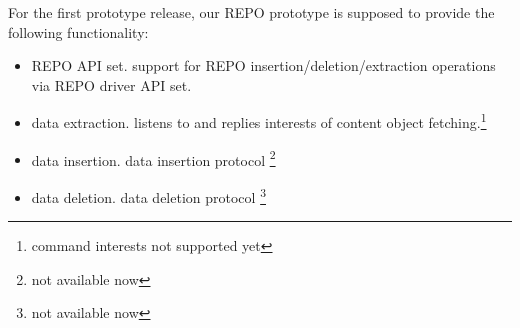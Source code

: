 For the first prototype release, our REPO prototype is supposed to provide the following functionality:
\begin{itemize}
    \item REPO API set. support for REPO insertion/deletion/extraction operations via REPO driver API set.
    \item data extraction. listens to and replies interests of content object fetching.\footnote{command interests not supported yet}
    \item data insertion. data insertion protocol \footnote{not available now}
    \item data deletion. data deletion protocol \footnote{not available now}
\end{itemize}
